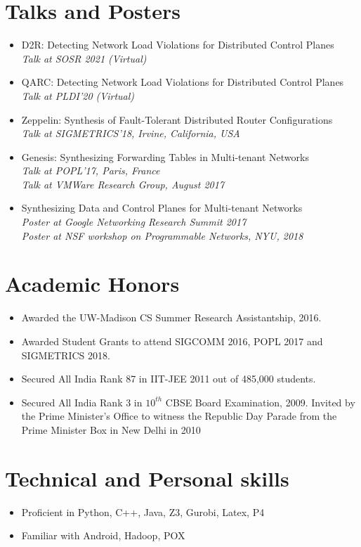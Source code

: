 \documentclass[11pt,a4paper,sans]{moderncv}        %
\begin{document}
\section{Talks and Posters}
\begin{itemize}
	\item D2R: Detecting Network Load Violations for Distributed Control Planes \\
	\emph{Talk at SOSR 2021 (Virtual)}

\item QARC: Detecting Network Load Violations for Distributed Control Planes \\
\emph{Talk at PLDI'20 (Virtual)}

\item Zeppelin: Synthesis of Fault-Tolerant Distributed Router Configurations \\
\emph{Talk at SIGMETRICS'18, Irvine, California, USA}

\item Genesis: Synthesizing Forwarding Tables in Multi-tenant Networks \\
\emph{Talk at POPL'17, Paris, France} \\
\emph{Talk at VMWare Research Group, August 2017}

\item Synthesizing Data and Control Planes for Multi-tenant Networks \\
\emph{Poster at Google Networking Research Summit 2017} \\
\emph{Poster at NSF workshop on Programmable Networks, NYU, 2018}
\end{itemize}
\section{Academic  Honors}
\begin{itemize}
\item{Awarded the UW-Madison CS Summer Research Assistantship, 2016.}
\item{Awarded Student Grants to attend SIGCOMM 2016, POPL 2017 and SIGMETRICS 2018.}
\item{Secured All India Rank 87 in IIT-JEE 2011 out of 485,000 students.}
\item{Secured All India Rank 3 in $10^{th}$ CBSE Board Examination, 2009. 
Invited by the Prime Minister's Office to witness the Republic Day 
Parade from the Prime Minister Box in New Delhi in 2010}
\end{itemize}

\section{Technical and Personal skills}
\begin{itemize}
\item Proficient in Python, C++, Java, Z3, Gurobi, Latex, P4
\item Familiar with Android, Hadoop, POX
\end{itemize}
\end{document}
